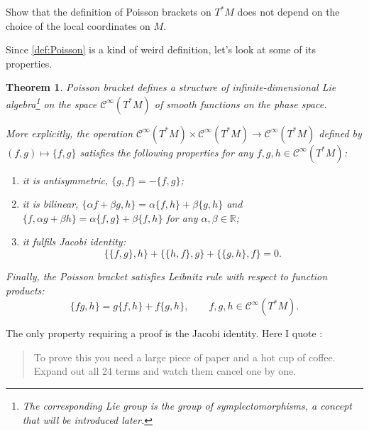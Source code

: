 \documentclass[english,fontsize=11pt,paper=a5,oneside]{scrbook}
\newcommand{\cC}{\mathcal{C}}
\newcommand{\R}{\mathbb{R}}
\newtheorem{theorem}{Theorem}[chapter]
\theoremstyle{definition}
\newenvironment{exercise}
  {\pushQED{\qed}\renewcommand{\qedsymbol}{$\maltese$}\exercisex}
  {\popQED\endexercisex}
\begin{document}
\begin{exercise}
  Show that the definition of Poisson brackets on $T^*M$ does not depend on the choice of the local coordinates on $M$.
\end{exercise}

Since \ref{def:Poisson} is a kind of weird definition, let's look at some of its properties.

\begin{theorem}\label{thm:PoissonLieAlgebra}
  Poisson bracket defines a structure of infinite-dimensional Lie algebra\footnote{The corresponding Lie group is the group of symplectomorphisms, a concept that will be introduced later.} on the space $\cC^\infty(T^*M)$ of smooth functions on the phase space.

  More explicitly, the operation $\cC^\infty(T^*M)\times \cC^\infty(T^*M) \to \cC^\infty(T^*M)$ defined by $(f,g) \mapsto \big\{f,g\big\}$ satisfies the following properties for any $f,g,h \in \cC^\infty(T^*M)$:
  \begin{enumerate}
    \item it is antisymmetric, $\big\{g,f\big\} = - \big\{f,g\big\}$;
    \item it is bilinear, $\big\{\alpha f + \beta g, h\big\} = \alpha\big\{f,h\big\} + \beta\big\{g,h\big\}$ and $\big\{f, \alpha g + \beta h\big\} = \alpha\big\{f,g\big\} + \beta\big\{f,h\big\}$ for any $\alpha, \beta \in\R$;
    \item it fulfils \emph{Jacobi identity}:
          \begin{equation}\label{eq:JacobiId}
            \big\{\big\{f,g\big\},h\big\} + \big\{\big\{h,f\big\},g\big\} + \big\{\big\{g,h\big\},f\big\} = 0.
          \end{equation}
  \end{enumerate}
  Finally, the Poisson bracket satisfies \emph{Leibnitz rule} with respect to function products:
  \begin{equation}\label{eq:LeibnitzId}
    \big\{fg, h\big\} = g\big\{f, h\big\} + f \big\{g, h\big\}, \qquad f,g,h \in \cC^\infty(T^*M).
  \end{equation}
\end{theorem}

The only property requiring a proof is the Jacobi identity.
Here I quote \cite{lectures:tong}:
\begin{quote}
  To prove this you need a large piece of paper and a hot cup of coffee. Expand out all 24 terms and watch them cancel one by one.
\end{quote}
\end{document}

